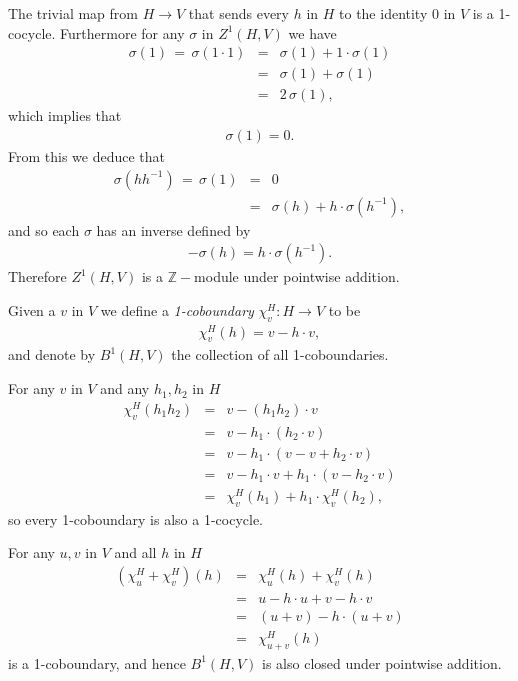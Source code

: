 The trivial map from $H \rightarrow V$ that sends every $h$ in $H$ to the identity 0 in $V$ is a 1-cocycle. Furthermore for any $\sigma$ in $Z^1(H, V)$ we have
\begin{eqnarray*}
	\sigma(1)\, =\, \sigma(1\cdot 1) &=& \sigma(1) + 1\cdot \sigma(1) \\
	&=& \sigma(1) + \sigma(1) \\
	&=& 2\,\sigma(1),
\end{eqnarray*}
which implies that
\begin{eqnarray*}
\sigma(1) = 0.
\end{eqnarray*}
From this we deduce that
\begin{eqnarray*}
	\sigma(hh^{-1})\, =\, \sigma(1) &=& 0 \\
	&=& \sigma(h) + h\cdot \sigma(h^{-1}),
\end{eqnarray*}
and so each $\sigma$ has an inverse defined by
\begin{eqnarray*}
	-\sigma(h) = h\cdot\sigma(h^{-1}).
\end{eqnarray*}
Therefore $Z^1\left(H, V\right)$ is a $\mathbb{Z}-$module under pointwise addition.

Given a $v$ in $V$ we define a \emph{1-coboundary} $\chi^H_v:H\rightarrow V$ to be
\begin{eqnarray*}
	\chi^H_v (h) = v - h\cdot v,
\end{eqnarray*}
and denote by $B^1\left(H, V\right)$ the collection of all 1-coboundaries. 

For any $v$ in $V$ and any $h_1, h_2$ in $H$
\begin{eqnarray*}
	\chi^H_v(h_1h_2) &=& v - (h_1h_2)\cdot v \\
	&=& v - h_1 \cdot \left(h_2\cdot v \right)\\
	&=& v - h_1 \cdot \left(v -v + h_2\cdot v \right)\\
	&=& v - h_1\cdot v + h_1\cdot \left( v - h_2\cdot v\right)\\
	&=& \chi^H_v(h_1) + h_1\cdot \chi^H_v(h_2),
\end{eqnarray*}
so every 1-coboundary is also a 1-cocycle. 

For any $u,v$ in $V$ and all $h$ in $H$
\begin{eqnarray*}
	(\chi^H_u + \chi^H_v)(h) &=& \chi^H_u(h) + \chi^H_v(h)\\
	&=& u - h\cdot u + v - h\cdot v \\
	&=& (u + v) - h\cdot (u + v) \\
	&=& \chi^H_{u + v} (h)
\end{eqnarray*}
is a 1-coboundary, and hence $B^1\left(H, V\right)$ is also closed under pointwise addition.


